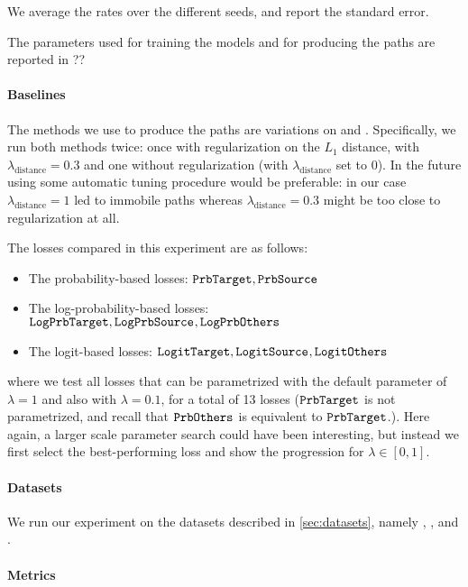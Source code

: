 \documentclass[../main.tex]{subfiles}
\begin{document}
We average the rates over the different seeds, and report the standard error.

The parameters used for training the models and for producing the paths are reported in ?? 

\paragraph{Baselines}

The methods we use to produce the paths are variations on \ls{} and \revise{}.
Specifically, we run both methods twice: once with regularization on the $L_1$ distance, with $\lambda_\text{distance} = 0.3$ and one without regularization (with $\lambda_\text{distance}$ set to 0).
In the future using some automatic tuning procedure would be preferable: in our case $\lambda_\text{distance} = 1$ led to immobile paths whereas $\lambda_\text{distance} = 0.3$ might be too close to regularization at all.

The losses compared in this experiment are as follows:
\begin{itemize}
    \item The probability-based losses: $\mathtt{PrbTarget}, \mathtt{PrbSource}_{}$
    \item The log-probability-based losses: $\mathtt{LogPrbTarget}, \mathtt{LogPrbSource}_{}, \mathtt{LogPrbOthers}_{}$
    \item The logit-based losses: $\mathtt{LogitTarget}, \mathtt{LogitSource}_{}, \mathtt{LogitOthers}_{}$
\end{itemize}
where we test all losses that can be parametrized with the default parameter of $\lambda = 1$ and also with $\lambda = 0.1$, for a total of 13 losses ($\mathtt{PrbTarget}$ is not parametrized, and recall that $\mathtt{PrbOthers}_{}$ is equivalent to $\mathtt{PrbTarget}$.).
Here again, a larger scale parameter search could have been interesting, but instead we first select the best-performing loss and show the progression for $\lambda \in [0, 1]$.

\paragraph{Datasets}

We run our experiment on the datasets described in \autoref{sec:datasets}, namely \CakeOnSea, \ForestCover, \WineQuality{} and \OnlineNewsPopularity.

\paragraph{Metrics}
\end{document}
